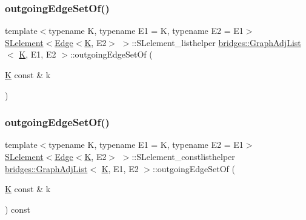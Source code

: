 \subsubsection{\texorpdfstring{outgoingEdgeSetOf()}{outgoingEdgeSetOf()}\hspace{0.1cm}{\footnotesize\ttfamily [1/2]}}
{\footnotesize\ttfamily template$<$typename K, typename E1 = K, typename E2 = E1$>$ \\
\mbox{\hyperlink{classbridges_1_1_s_lelement}{S\+Lelement}}$<$\mbox{\hyperlink{classbridges_1_1_edge}{Edge}}$<$\mbox{\hyperlink{namespacebridges_acfb0a4f7877d8f63de3e6862004c50edaa5f3c6a11b03839d46af9fb43c97c188}{K}}, E2$>$ $>$\+::S\+Lelement\+\_\+listhelper \mbox{\hyperlink{classbridges_1_1_graph_adj_list}{bridges\+::\+Graph\+Adj\+List}}$<$ \mbox{\hyperlink{namespacebridges_acfb0a4f7877d8f63de3e6862004c50edaa5f3c6a11b03839d46af9fb43c97c188}{K}}, E1, E2 $>$\+::outgoing\+Edge\+Set\+Of (\begin{DoxyParamCaption}\item[{\mbox{\hyperlink{namespacebridges_acfb0a4f7877d8f63de3e6862004c50edaa5f3c6a11b03839d46af9fb43c97c188}{K}} const \&}]{k }\end{DoxyParamCaption})\hspace{0.3cm}{\ttfamily [inline]}}

\mbox{\label{classbridges_1_1_graph_adj_list_afa8432734d70f7694147d4aac757a6eb}} 
\subsubsection{\texorpdfstring{outgoingEdgeSetOf()}{outgoingEdgeSetOf()}\hspace{0.1cm}{\footnotesize\ttfamily [2/2]}}
{\footnotesize\ttfamily template$<$typename K, typename E1 = K, typename E2 = E1$>$ \\
\mbox{\hyperlink{classbridges_1_1_s_lelement}{S\+Lelement}}$<$\mbox{\hyperlink{classbridges_1_1_edge}{Edge}}$<$\mbox{\hyperlink{namespacebridges_acfb0a4f7877d8f63de3e6862004c50edaa5f3c6a11b03839d46af9fb43c97c188}{K}}, E2$>$ $>$\+::S\+Lelement\+\_\+constlisthelper \mbox{\hyperlink{classbridges_1_1_graph_adj_list}{bridges\+::\+Graph\+Adj\+List}}$<$ \mbox{\hyperlink{namespacebridges_acfb0a4f7877d8f63de3e6862004c50edaa5f3c6a11b03839d46af9fb43c97c188}{K}}, E1, E2 $>$\+::outgoing\+Edge\+Set\+Of (\begin{DoxyParamCaption}\item[{\mbox{\hyperlink{namespacebridges_acfb0a4f7877d8f63de3e6862004c50edaa5f3c6a11b03839d46af9fb43c97c188}{K}} const \&}]{k }\end{DoxyParamCaption}) const\hspace{0.3cm}{\ttfamily [inline]}}

